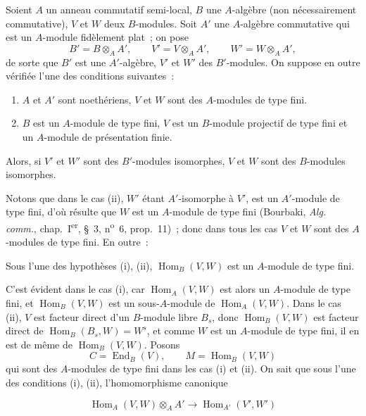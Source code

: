 \begin{proposition}[2.5.8]
\label{IV.2.5.8-fr}
Soient $A$ un anneau commutatif semi-local, $B$ une $A$-algèbre (non
nécessairement commutative), $V$ et $W$ deux $B$-modules. Soit $A'$ une
$A$-algèbre commutative qui est un $A$-module fidèlement plat~; on pose
\[
B'=B\otimes_A A',\qquad V'=V\otimes_A A',\qquad W'=W\otimes_A A',
\]
de sorte que $B'$ est une $A'$-algèbre, $V'$ et $W'$ des $B'$-modules. On
suppose en outre vérifiée l'une des conditions suivantes~:
\begin{enumerate}
\item[(i)] $A$ et $A'$ sont noethériens, $V$ et $W$ sont des $A$-modules de
type fini.
\item[(ii)] $B$ est un $A$-module de type fini, $V$ est un $B$-module
projectif de type fini et un $A$-module de présentation finie.
\end{enumerate}
Alors, si $V'$ et $W'$ sont des $B'$-modules isomorphes, $V$ et $W$ sont des
$B$-modules isomorphes.
\end{proposition}

Notons que dans le cas (ii), $W'$ étant $A'$-isomorphe à $V'$, est un
$A'$-module de type fini, d'où résulte que $W$ est un $A$-module de type fini
(Bourbaki, \emph{Alg. comm.}, chap.~I\textsuperscript{er}, \S~3,
n\textsuperscript{o}~6, prop.~11)~; donc dans tous les cas $V$ et $W$ sont
des $A$-modules de type fini. En outre~:

\begin{env}[2.5.8.1]
\label{IV.2.5.8.1-fr}
Sous l'une des hypothèses (i), (ii), $\operatorname{Hom}_B(V,W)$ est un
$A$-module de type fini.
\end{env}

C'est évident dans le cas (i), car $\operatorname{Hom}_A(V,W)$ est alors un
$A$-module de type fini, et $\operatorname{Hom}_B(V,W)$ est un sous-$A$-module
de $\operatorname{Hom}_A(V,W)$. Dans le cas (ii), $V$ est facteur direct d'un
$B$-module libre $B_s$, donc $\operatorname{Hom}_B(V,W)$ est facteur direct de
$\operatorname{Hom}_B(B_s,W)=W^s$, et comme $W$ est un $A$-module de type
fini, il en est de même de $\operatorname{Hom}_B(V,W)$. Posons
\[
C=\operatorname{End}_B(V),\qquad M=\operatorname{Hom}_B(V,W)
\]
qui sont des $A$-modules de type fini dans les cas (i) et (ii). On sait que
sous l'une des conditions (i), (ii), l'homomorphisme canonique

\begin{env}[2.5.8.2]
\label{IV.2.5.8.2-fr}
\[
\operatorname{Hom}_A(V,W)\otimes_A A'\longrightarrow
\operatorname{Hom}_{A'}(V',W')
\]
\end{env}


